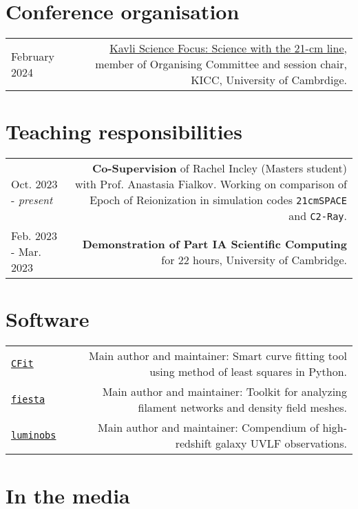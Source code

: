 \documentclass{article}
\begin{document}
\section*{Conference organisation}

\begin{tabular}{L!{\vrule}R}
  February 2024  &\href{https://www.kicc.cam.ac.uk/events/kavli-science-themed-meetings/science-21-cm-hydrogen-line}{Kavli Science Focus: Science with the 21-cm line}, member of Organising Committee and session chair, KICC, University of Cambrdige. \\
\end{tabular}
\section*{Teaching responsibilities}

\begin{tabular}{L!{\vrule}R}

	Oct. 2023 - \textit{present} & \textbf{Co-Supervision} of Rachel Incley (Masters student) with Prof. Anastasia Fialkov. Working on comparison of Epoch of Reionization in simulation codes \texttt{21cmSPACE} and \texttt{C2-Ray}. \\
  Feb. 2023 - Mar. 2023 & \textbf{Demonstration of Part IA Scientific Computing} for 22 hours, University of Cambridge.\\

\end{tabular}

\section*{Software}

\begin{tabular}{L!{\vrule}R}
	\href{https://github.com/JitenDhandha/CFit}{\texttt{CFit}} & Main author and maintainer: Smart curve fitting tool using method of least squares in Python.\\
	\href{https://fiesta-astro.readthedocs.io}{\texttt{fiesta}} & Main author and maintainer: Toolkit for analyzing filament networks and density field meshes. \\
	\href{https://github.com/JitenDhandha/luminobs}{\texttt{luminobs}} & Main author and maintainer: Compendium of high-redshift galaxy UVLF observations.\\
\end{tabular}

\section*{In the media}
\end{document}
